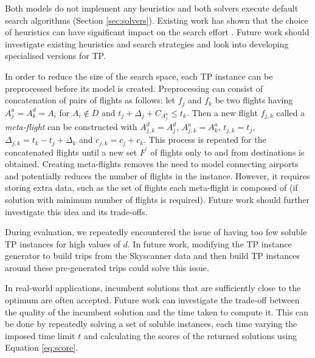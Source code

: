 \documentclass{mpaper}
\begin{document}
Both models do not implement any heuristics and both solvers execute default search algorithms (Section \ref{sec:solvers}). Existing work has shown that the choice of heuristics can have significant impact on the search effort \cite{Haralick80:a, Gent96,Christopher03}. Future work should investigate existing heuristics and search strategies and look into developing specialised versions for TP.

In order to reduce the size of the search space, each TP instance can be preprocessed before its model is created. Preprocessing can consist of concatenation of pairs of flights as follows: let $f_j$ and $f_k$ be two flights having $A^a_j = A^d_k = A_i$ for $A_i \notin D$ and $t_j + \Delta_j + C_{A^a_j} \leq t_k$. Then a new flight $f_{j,k}$ called a \textit{meta-flight} can be constructed with $A^d_{j,k} = A^d_j$, $A^a_{j,k} = A^a_{k}$, $t_{j,k} = t_{j}$, $\Delta_{j,k} = t_k - t_j + \Delta_k$ and $c_{j,k} = c_j + c_k$. This process is repeated for the concatenated flights until a new set $F^\prime$ of flights only to and from destinations is obtained. Creating meta-flights removes the need to model connecting airports and potentially reduces the number of flights in the instance. However, it requires storing extra data, such as the set of flights each meta-flight is composed of (if solution with minimum number of flights is required). Future work should further investigate this idea and its trade-offs.


During evaluation, we repeatedly encountered the issue of having too few soluble TP instances for high values of $d$. In future work, modifying the TP instance generator to build trips from the Skyscanner data and then build TP instances around these pre-generated trips could solve this issue.

In real-world applications, incumbent solutions that are sufficiently close to the optimum are often accepted. Future work can investigate the trade-off between the quality of the incumbent solution and the time taken to compute it. This can be done by repeatedly solving a set of soluble instances, each time varying the imposed time limit $t$ and calculating the scores of the returned solutions using Equation \ref{eq:score}.
\end{document}
